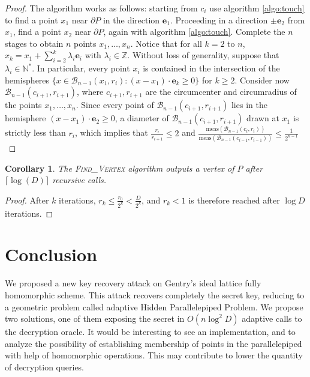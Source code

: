 \documentclass[11pt]{article}
\theoremstyle{plain}
\newtheorem*{COR}{Corollary}
\theoremstyle{definition}
\theoremstyle{remark}
\newcommand{\ZZ}{\mathbb{Z}}      %
\newcommand{\NN}{\mathbb{N}}      %
\newcommand{\ee}{\mathbf{e}}
\begin{document}
\begin{proof}
The algorithm works as follows: starting from $c_i$ use algorithm \ref{algo:touch} to find a point $x_1$ near $\partial P$ in the direction $\ee_1$. Proceeding in a direction $\pm\ee_2$ from $x_1$, find a point $x_2$ near $\partial P$, again with algorithm \ref{algo:touch}. Complete the $n$ stages to obtain $n$ points $x_1,\dots,x_n$. Notice that for all $k=2$ to $n$, $x_k=x_1+\sum_{i=2}^{k}\lambda_i\ee_i$ with $\lambda_i\in \ZZ$. Without loss of generality, suppose that $\lambda_i\in\NN^\ast$. In particular, every point $x_i$ is contained in the intersection of the hemispheres 
$\{x\in\mathcal{B}_{n-1}(x_1,r_i): (x-x_1)\cdot \ee_k\geq 0\}$ for $k\geq 2$. Consider now $\mathcal{B}_{n-1}(c_{i+1},r_{i+1})$, where $c_{i+1},r_{i+1}$ are the circumcenter and circumradius of the points $x_1,\dots,x_n$. Since every point of $\mathcal{B}_{n-1}(c_{i+1},r_{i+1})$ lies in the hemisphere $(x-x_1)\cdot \ee_2\geq 0$, a diameter of $\mathcal{B}_{n-1}(c_{i+1},r_{i+1})$ drawn at $x_1$ is strictly less than $r_i$, which implies that $\frac{r_i}{r_{i+1}} \leq 2$ and $\frac{\mathrm{meas}(\mathcal{B}_{n-1}(c_i,r_i))}{\mathrm{meas}(\mathcal{B}_{n-1}(c_{i-1},r_{i-1}))}\leq  \frac{1}{2^{n-1}}$ 
\end{proof}

\begin{COR}
The \textsc{Find\_Vertex} algorithm outputs a vertex of $P$ after $\lceil\log(D)\rceil$ recursive calls.
\end{COR}
\begin{proof}
After $k$ iterations, $r_k\leq \frac{r_0}{2^k}<\frac{D}{2^k}$, and $r_k<1$ is therefore reached after $\log D$ iterations. 
\end{proof}

\section{Conclusion}

We proposed a new key recovery attack on Gentry's ideal lattice fully homomorphic scheme. This attack recovers completely the secret key, reducing to a geometric problem called adaptive Hidden Parallelepiped Problem. We propose two solutions, one of them exposing the secret in $O(n\log^2 D)$ adaptive calls to the decryption oracle. It would be interesting to see an implementation, and to analyze the possibility of establishing membership of points in the parallelepiped with help of homomorphic operations. This may contribute to lower the quantity of decryption queries.

\end{document}
